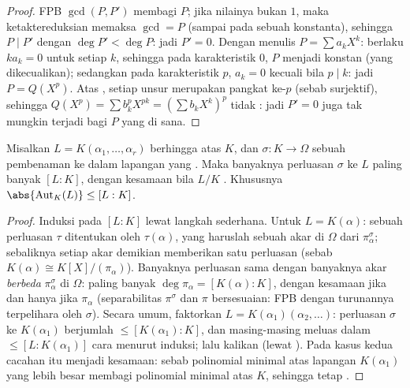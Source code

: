 \begin{proof}
FPB $\gcd(P, P')$ membagi $P$; jika nilainya bukan $1$, maka ketaktereduksian
memaksa $\gcd = P$ (sampai pada sebuah konstanta), sehingga $P \mid P'$ dengan $\deg
P' < \deg P$: jadi $P' = 0$. Dengan menulis $P = \sum a_kX^k$: berlaku $ka_k = 0$
untuk setiap $k$, sehingga pada karakteristik $0$, $P$ menjadi konstan (yang dikecualikan);
sedangkan pada karakteristik $p$, $a_k = 0$ kecuali bila $p \mid k$: jadi $P =
Q(X^p)$. Atas , setiap unsur merupakan pangkat ke-$p$
(sebab  surjektif), sehingga $Q(X^p) = \sum b_k^p X^{pk} = (\sum
b_kX^k)^p$ tidak : jadi $P' = 0$ juga tak mungkin terjadi bagi
$P$ yang  di sana.
\end{proof}

\begin{proposition}\label{prop:b3:galois:embeddings}
Misalkan $L = K(\alpha_1, \dots, \alpha_r)$ berhingga atas $K$, dan
$\sigma \colon K \to \Omega$ sebuah pembenaman ke dalam lapangan yang . Maka banyaknya perluasan $\sigma$ ke $L$
paling banyak $[L:K]$, dengan kesamaan bila $L/K$ . Khususnya
$\abs{\operatorname{Aut}_K(L)} \leq [L:K]$.
\end{proposition}

\begin{proof}
Induksi pada $[L:K]$ lewat langkah sederhana. Untuk $L = K(\alpha)$: sebuah
perluasan $\tau$ ditentukan oleh $\tau(\alpha)$, yang haruslah sebuah
akar di $\Omega$ dari $\pi_\alpha^\sigma$; sebaliknya setiap akar demikian
memberikan satu perluasan (sebab $K(\alpha) \cong K[X]/(\pi_\alpha)$).
Banyaknya perluasan sama dengan banyaknya akar \emph{berbeda}
$\pi_\alpha^\sigma$ di $\Omega$: paling banyak $\deg\pi_\alpha =
[K(\alpha):K]$, dengan kesamaan jika dan hanya jika $\pi_\alpha$ 
(separabilitas $\pi^\sigma$ dan $\pi$ bersesuaian: FPB dengan
turunannya terpelihara oleh $\sigma$). Secara umum, faktorkan $L =
K(\alpha_1)(\alpha_2, \dots)$: perluasan $\sigma$ ke
$K(\alpha_1)$ berjumlah $\leq [K(\alpha_1):K]$, dan masing-masing meluas dalam
$\leq [L : K(\alpha_1)]$ cara menurut induksi; lalu kalikan (lewat ). Pada kasus  kedua cacahan itu menjadi kesamaan: sebab polinomial
minimal atas lapangan $K(\alpha_1)$ yang lebih besar membagi polinomial minimal
atas $K$, sehingga tetap .
\end{proof}

